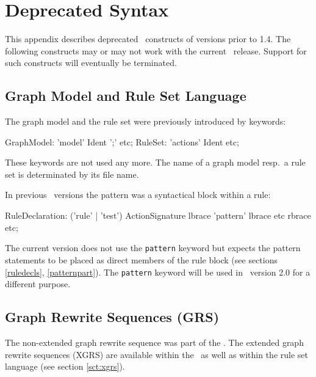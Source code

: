 \chapter{Deprecated Syntax}
\label{sct:deprecated}

This appendix describes deprecated \GrG\ constructs of versions prior to 1.4.
The following constructs may or may not work with the current \GrG\ release.
Support for such constructs will eventually be terminated.

\section{Graph Model and Rule Set Language}
The graph model and the rule set were previously introduced by keywords:
\begin{rail}
  GraphModel: 'model' Ident ';' etc;
  RuleSet: 'actions' Ident etc;
\end{rail}
These keywords are not used any more.
The name of a graph model resp.\ a rule set is determinated by its file name.

In previous \GrG\ versions the pattern was a syntactical block within a rule:
\begin{rail}
  RuleDeclaration: ('rule' | 'test') ActionSignature lbrace 'pattern' lbrace etc rbrace etc;
\end{rail}
The current version does not use the \texttt{pattern} keyword but expects the pattern statements to be placed as direct members of the rule block (see sections \ref{ruledecls}, \ref{patternpart}).
The \texttt{pattern} keyword will be used in \GrG\ version 2.0 for a different purpose.

\section{Graph Rewrite Sequences (GRS)}
The non-extended graph rewrite sequence was part of the \GrShell.
The extended graph rewrite sequences (XGRS) are available within the \GrShell\ as well as within the rule set language (see section \ref{sct:xgrs}).

